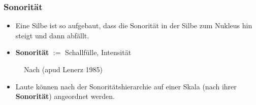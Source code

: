 
\begin{frame}
\frametitle{Sonorität}

\begin{itemize}
	\item Eine Silbe ist so aufgebaut, dass die Sonorität in der Silbe zum Nukleus hin steigt und dann abfällt.

	\item \textbf{Sonorität} $:=$ Schallfülle, Intensität

\end{itemize}

\begin{figure}
	\centering
	\caption{Nach \citet[93]{Ramers08a} (apud Lenerz 1985)}
\end{figure}


\begin{itemize}
	\item Laute können nach der Sonoritätshierarchie auf einer Skala (nach ihrer \textbf{Sonorität}) angeordnet werden.
\end{itemize}

\end{frame}




